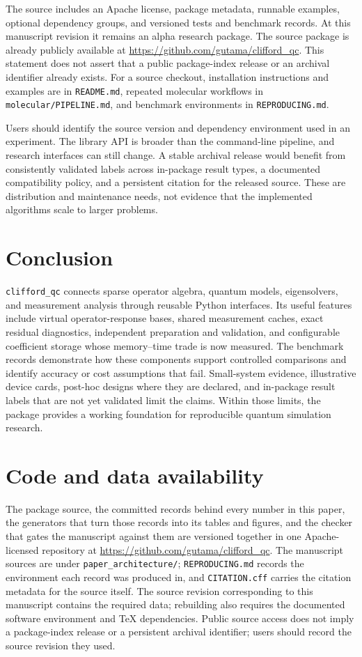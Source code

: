 \documentclass[aps,pra,reprint,superscriptaddress,nofootinbib,floatfix,
  showkeys]{revtex4-2}
\newcommand{\pkg}{\texttt{clifford\_qc}}
\begin{document}
The source includes an Apache license, package metadata, runnable examples,
optional dependency groups, and versioned tests and benchmark records. At this
manuscript revision it remains an alpha research package. The source package
is already publicly available at
\url{https://github.com/gutama/clifford_qc}. This statement does not assert that
a public package-index release or an archival identifier already exists.
For a source checkout, installation instructions and examples are in
\texttt{README.md}, repeated molecular workflows in \texttt{molecular/PIPELINE.md}, and
benchmark environments in \texttt{REPRODUCING.md}.

Users should identify the source version and dependency environment used in an
experiment. The library API is broader than the command-line pipeline, and
research interfaces can still change. A stable archival release would benefit
from consistently validated labels across in-package result types, a documented
compatibility policy, and a persistent citation for the released source. These
are distribution and maintenance needs, not evidence that the implemented
algorithms scale to larger problems.

\section{Conclusion}
\label{sec:conclusion}

\pkg{} connects sparse operator algebra, quantum models, eigensolvers, and
measurement analysis through reusable Python interfaces. Its useful features
include virtual operator-response bases, shared measurement caches, exact
residual diagnostics, independent preparation and validation, and configurable
coefficient storage whose memory--time trade is now measured. The benchmark
records demonstrate how these components support controlled comparisons and
identify accuracy or cost assumptions that fail. Small-system evidence,
illustrative device cards, post-hoc designs where they are declared, and
in-package result labels that are not yet validated limit the claims. Within
those limits, the package provides a working foundation for reproducible
quantum simulation research.

\section*{Code and data availability}

The package source, the committed records behind every number in this paper,
the generators that turn those records into its tables and figures, and the
checker that gates the manuscript against them are versioned together in one
Apache-licensed repository at
\url{https://github.com/gutama/clifford_qc}. The manuscript sources are under
\texttt{paper\_architecture/}; \texttt{REPRODUCING.md} records the environment
each record was produced in, and \texttt{CITATION.cff} carries the citation
metadata for the source itself. The source revision corresponding to this
manuscript contains the required data; rebuilding also requires the documented
software environment and TeX dependencies. Public source access does not imply a package-index release or a persistent
archival identifier; users should record the source revision they used.
\end{document}
